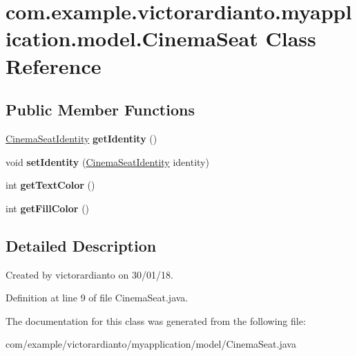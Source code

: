 \hypertarget{classcom_1_1example_1_1victorardianto_1_1myapplication_1_1model_1_1_cinema_seat}{}\section{com.\+example.\+victorardianto.\+myapplication.\+model.\+Cinema\+Seat Class Reference}
\label{classcom_1_1example_1_1victorardianto_1_1myapplication_1_1model_1_1_cinema_seat}
\subsection*{Public Member Functions}
\begin{DoxyCompactItemize}
\item 
\mbox{\label{classcom_1_1example_1_1victorardianto_1_1myapplication_1_1model_1_1_cinema_seat_af5376bd5edc4756f9e04dea62e47f9b1}} 
\mbox{\hyperlink{classcom_1_1example_1_1victorardianto_1_1myapplication_1_1model_1_1_cinema_seat_identity}{Cinema\+Seat\+Identity}} {\bfseries get\+Identity} ()
\item 
\mbox{\label{classcom_1_1example_1_1victorardianto_1_1myapplication_1_1model_1_1_cinema_seat_a04c3b1060a359aef2db6a207df4f4098}} 
void {\bfseries set\+Identity} (\mbox{\hyperlink{classcom_1_1example_1_1victorardianto_1_1myapplication_1_1model_1_1_cinema_seat_identity}{Cinema\+Seat\+Identity}} identity)
\item 
\mbox{\label{classcom_1_1example_1_1victorardianto_1_1myapplication_1_1model_1_1_cinema_seat_ac91dd9631d78ecc64e9cab067502fabf}} 
int {\bfseries get\+Text\+Color} ()
\item 
\mbox{\label{classcom_1_1example_1_1victorardianto_1_1myapplication_1_1model_1_1_cinema_seat_a35b214dab3ebd74ed36c5a556a57f2d5}} 
int {\bfseries get\+Fill\+Color} ()
\end{DoxyCompactItemize}


\subsection{Detailed Description}
Created by victorardianto on 30/01/18. 

Definition at line 9 of file Cinema\+Seat.\+java.



The documentation for this class was generated from the following file\+:\begin{DoxyCompactItemize}
\item 
com/example/victorardianto/myapplication/model/Cinema\+Seat.\+java\end{DoxyCompactItemize}
